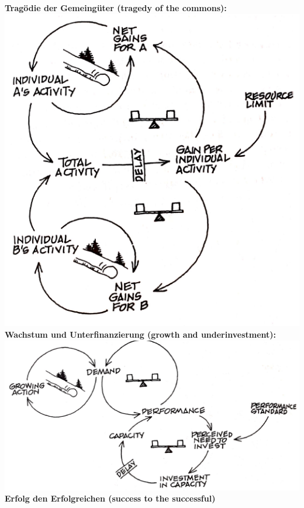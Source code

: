 \begin{multicols}{3}
	\textbf{Tragödie der Gemeingüter (tragedy of the commons):}\\
	\includegraphics[width=\linewidth]{pictures/archetype7}\\
	\vfill\null
	\columnbreak
	\textbf{Wachstum und Unterfinanzierung (growth and underinvestment):}\\
	\includegraphics[width=\linewidth]{pictures/archetype8}\\
	\vfill\null
	\columnbreak
	\textbf{Erfolg den Erfolgreichen (success to the successful)}\\

\end{multicols}

